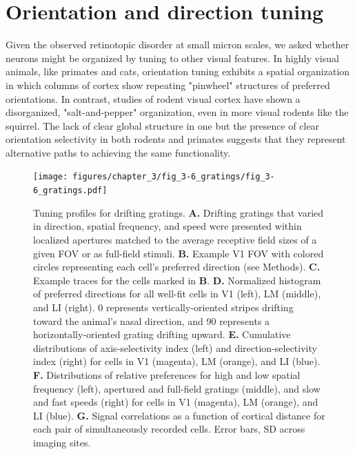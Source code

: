 \section{Orientation and direction tuning}
Given the observed retinotopic disorder at small micron scales, we asked whether neurons might be organized by tuning to other visual features. In highly visual animals, like primates and cats, orientation tuning exhibits a spatial organization in which columns of cortex show repeating "pinwheel" structures of preferred orientations\cite{REFREF}. In contrast, studies of rodent visual cortex have shown a disorganized, "salt-and-pepper" organization\cite{Ohki2005, REFREF}, even in more visual rodents like the squirrel\cite{VanHooser2005FunctionalRodent, REFREF}. The lack of clear global structure in one but the presence of clear orientation selectivity in both rodents and primates suggests that they represent alternative paths to achieving the same functionality.

\begin{figure}[t!]
    \texttt{[image: figures/chapter\_3/fig\_3-6\_gratings/fig\_3-6\_gratings.pdf]}
    \vspace{.1in}
    \caption[Responses to drifting gratings]{Tuning profiles for drifting gratings.
    \textbf{A.} Drifting gratings that varied in direction, spatial frequency, and speed were presented within localized apertures matched to the average receptive field sizes of a given FOV or as full-field stimuli.
    \textbf{B.} Example V1 FOV with colored circles representing each cell's preferred direction (see Methods).
    \textbf{C.} Example traces for the cells marked in \textbf{B}. 
    \textbf{D.} Normalized histogram of preferred directions for all well-fit cells in V1 (left), LM (middle), and LI (right). 0 represents vertically-oriented stripes drifting toward the animal's nasal direction, and 90 represents a horizontally-oriented grating drifting upward.
    \textbf{E.} Cumulative distributions of axis-selectivity index (left) and direction-selectivity index (right) for cells in V1 (magenta), LM (orange), and LI (blue).
    \textbf{F.} Distributions of relative preferences for high and low spatial frequency (left), apertured and full-field gratings (middle), and slow and fast speeds (right) for cells in V1 (magenta), LM (orange), and LI (blue).
    \textbf{G.} Signal correlations as a function of cortical distance for each pair of simultaneously recorded cells. Error bars, SD across imaging sites.  
    \label{fig:gratings}}
\end{figure}

